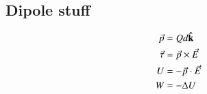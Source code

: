 \documentclass{article}
\begin{document}
\begin{multicols}{2}
\subsection*{Dipole stuff}
\begin{align*}
	\vec{p} &= Qd\vu k \\
	\vec{\tau} &= \vec{p} \times \vec{E} \\
	U &= -\vec{p} \cdot \vec{E} \\
	W &= - \Delta U
\end{align*}

\end{multicols}
\end{document}
